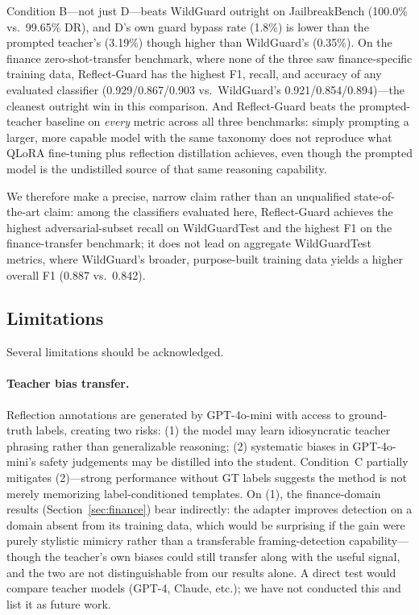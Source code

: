 \documentclass[Superintelligence,article,submit,pdftex,moreauthors]{Definitions/mdpi}
\begin{document}
Condition B---not just D---beats WildGuard outright on JailbreakBench (100.0\% vs.\ 99.65\% DR), and D's own guard bypass rate (1.8\%) is lower than the prompted teacher's (3.19\%) though higher than WildGuard's (0.35\%). On the finance zero-shot-transfer benchmark, where none of the three saw finance-specific training data, Reflect-Guard has the highest F1, recall, and accuracy of any evaluated classifier (0.929/0.867/0.903 vs.\ WildGuard's 0.921/0.854/0.894)---the cleanest outright win in this comparison. And Reflect-Guard beats the prompted-teacher baseline on \emph{every} metric across all three benchmarks: simply prompting a larger, more capable model with the same taxonomy does not reproduce what QLoRA fine-tuning plus reflection distillation achieves, even though the prompted model is the undistilled source of that same reasoning capability.

We therefore make a precise, narrow claim rather than an unqualified state-of-the-art claim: among the classifiers evaluated here, Reflect-Guard achieves the highest adversarial-subset recall on WildGuardTest and the highest F1 on the finance-transfer benchmark; it does not lead on aggregate WildGuardTest metrics, where WildGuard's broader, purpose-built training data yields a higher overall F1 (0.887 vs.\ 0.842).

\subsection{Limitations}
\label{sec:limitations}

Several limitations should be acknowledged.

\paragraph{Teacher bias transfer.}
Reflection annotations are generated by GPT-4o-mini with access to ground-truth labels, creating two risks: (1) the model may learn idiosyncratic teacher phrasing rather than generalizable reasoning; (2) systematic biases in GPT-4o-mini's safety judgements may be distilled into the student. Condition~C partially mitigates (2)---strong performance without GT labels suggests the method is not merely memorizing label-conditioned templates. On (1), the finance-domain results (Section~\ref{sec:finance}) bear indirectly: the adapter improves detection on a domain absent from its training data, which would be surprising if the gain were purely stylistic mimicry rather than a transferable framing-detection capability---though the teacher's own biases could still transfer along with the useful signal, and the two are not distinguishable from our results alone. A direct test would compare teacher models (GPT-4, Claude, etc.); we have not conducted this and list it as future work.
\end{document}
